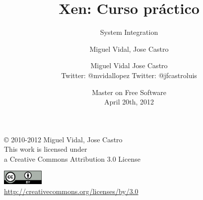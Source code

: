\documentclass{beamer}
\begin{document}
\title{Xen: Curso práctico}
\subtitle{System Integration}
\author{Miguel Vidal, Jose Castro} 
\date{\footnotesize{Master on Free Software \\ April 20th, 2012}}
\author{Miguel Vidal \hspace{1cm} Jose Castro \\
\hspace{0.5mm} {\tiny Twitter: @mvidallopez \hspace{1.1cm}Twitter: @jfcastroluis}
}



\begin{frame}
  \vspace{2cm}
  \begin{flushright}
    {\small \copyright{} 2010-2012 Miguel Vidal, Jose Castro} \\
    \medskip
    {\scriptsize This work is licensed under \\ a Creative Commons Attribution 3.0 License}
  \end{flushright}
  \begin{flushright}
    \href{http://creativecommons.org/licenses/by/3.0/es}{\includegraphics[width=2cm]{format/cc-by.png}} \\
    {\tiny \url{http://creativecommons.org/licenses/by/3.0}}
  \end{flushright}
\end{frame}%

\usebackgroundtemplate{}

\end{document}
